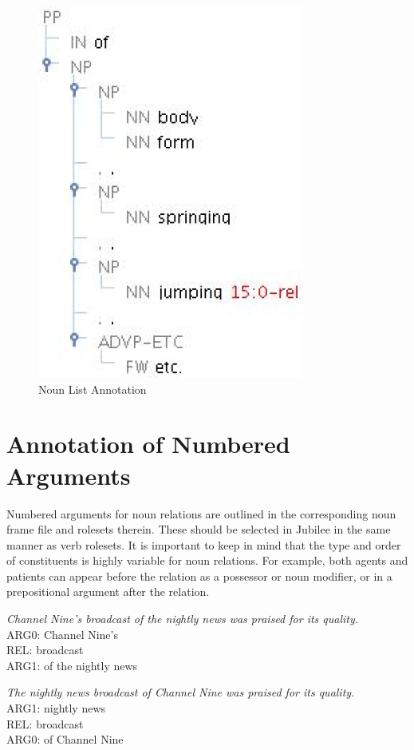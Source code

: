 \documentclass[11pt]{report}
\begin{document}
\begin{figure}[htbp]
\centering
\includegraphics[scale=0.5]{img/list.png}
\caption{Noun List Annotation}
\label{fig: list}
\end{figure}

\section{Annotation of Numbered Arguments}
Numbered arguments for noun relations are outlined in the corresponding noun frame file and rolesets therein.  These should be selected in Jubilee in the same manner as verb rolesets.  It is important to keep in mind that the type and order of constituents is highly variable for noun relations.  For example, both agents and patients can appear before the relation as a possessor or noun modifier, or in a prepositional argument after the relation. 

\textit{Channel Nine's broadcast of the nightly news was praised for its quality.}\\
ARG0: Channel Nine's\\
REL: broadcast\\
ARG1: of the nightly news

\textit{The nightly news broadcast of Channel Nine was praised for its quality.}\\
ARG1: nightly news\\
REL: broadcast \\
ARG0: of Channel Nine
\end{document}
